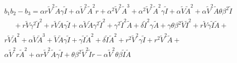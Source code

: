 \documentclass[12pt]{article}
\numberwithin{equation}{section}
\begin{document}
\begin{enumerate}[i).]
\begin{equation}\label{sec3:e35}
\begin{split}
b_1b_2-b_3=\alpha r \tilde V^2 \tilde A \gamma \tilde I + \alpha \tilde V^2 \tilde A^2 r + \alpha^2 \tilde V^2 \tilde A^3 + \alpha^2\tilde V^2\tilde A^2\gamma \tilde I + \alpha \tilde V \tilde A^2 + \alpha \tilde V^2 \tilde A \theta \beta^2\tilde I \\
~~~~~~+ r\tilde V \gamma^2\tilde I^2 + r\tilde V\tilde A\gamma\tilde I+ \alpha \tilde V\tilde A\gamma^2\tilde I^2 + \gamma^2\tilde I^2\tilde A+\delta  \tilde I^2\gamma \tilde A
+\gamma \theta \beta^2 \tilde V \tilde I^2+ r\tilde V\gamma\tilde I \tilde A +\\
r\tilde V \tilde A^2 + \alpha \tilde V\tilde A^3+\tilde V\tilde A\gamma \tilde I+\gamma \tilde I \tilde A^2 +\delta \tilde I \tilde A^2 +r^2\tilde V^2\gamma\tilde I+r^2\tilde V^2\tilde A+\\
\alpha \tilde V^2 r \tilde A^2 + \alpha r \tilde V^2 \tilde A \gamma \tilde I+ \theta \beta^2 \tilde V^2 \tilde I r -\alpha\tilde V^2 \theta \beta \tilde I \tilde A
\end{split}
\end{equation}
\end{enumerate}
\end{document}
